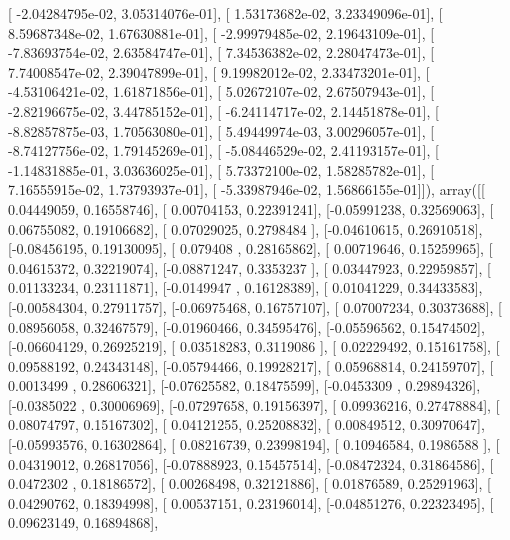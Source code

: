 \documentclass{article}
\begin{document}
       [ -2.04284795e-02,   3.05314076e-01],
       [  1.53173682e-02,   3.23349096e-01],
       [  8.59687348e-02,   1.67630881e-01],
       [ -2.99979485e-02,   2.19643109e-01],
       [ -7.83693754e-02,   2.63584747e-01],
       [  7.34536382e-02,   2.28047473e-01],
       [  7.74008547e-02,   2.39047899e-01],
       [  9.19982012e-02,   2.33473201e-01],
       [ -4.53106421e-02,   1.61871856e-01],
       [  5.02672107e-02,   2.67507943e-01],
       [ -2.82196675e-02,   3.44785152e-01],
       [ -6.24114717e-02,   2.14451878e-01],
       [ -8.82857875e-03,   1.70563080e-01],
       [  5.49449974e-03,   3.00296057e-01],
       [ -8.74127756e-02,   1.79145269e-01],
       [ -5.08446529e-02,   2.41193157e-01],
       [ -1.14831885e-01,   3.03636025e-01],
       [  5.73372100e-02,   1.58285782e-01],
       [  7.16555915e-02,   1.73793937e-01],
       [ -5.33987946e-02,   1.56866155e-01]]), array([[ 0.04449059,  0.16558746],
       [ 0.00704153,  0.22391241],
       [-0.05991238,  0.32569063],
       [ 0.06755082,  0.19106682],
       [ 0.07029025,  0.2798484 ],
       [-0.04610615,  0.26910518],
       [-0.08456195,  0.19130095],
       [ 0.079408  ,  0.28165862],
       [ 0.00719646,  0.15259965],
       [ 0.04615372,  0.32219074],
       [-0.08871247,  0.3353237 ],
       [ 0.03447923,  0.22959857],
       [ 0.01133234,  0.23111871],
       [-0.0149947 ,  0.16128389],
       [ 0.01041229,  0.34433583],
       [-0.00584304,  0.27911757],
       [-0.06975468,  0.16757107],
       [ 0.07007234,  0.30373688],
       [ 0.08956058,  0.32467579],
       [-0.01960466,  0.34595476],
       [-0.05596562,  0.15474502],
       [-0.06604129,  0.26925219],
       [ 0.03518283,  0.3119086 ],
       [ 0.02229492,  0.15161758],
       [ 0.09588192,  0.24343148],
       [-0.05794466,  0.19928217],
       [ 0.05968814,  0.24159707],
       [ 0.0013499 ,  0.28606321],
       [-0.07625582,  0.18475599],
       [-0.0453309 ,  0.29894326],
       [-0.0385022 ,  0.30006969],
       [-0.07297658,  0.19156397],
       [ 0.09936216,  0.27478884],
       [ 0.08074797,  0.15167302],
       [ 0.04121255,  0.25208832],
       [ 0.00849512,  0.30970647],
       [-0.05993576,  0.16302864],
       [ 0.08216739,  0.23998194],
       [ 0.10946584,  0.1986588 ],
       [ 0.04319012,  0.26817056],
       [-0.07888923,  0.15457514],
       [-0.08472324,  0.31864586],
       [ 0.0472302 ,  0.18186572],
       [ 0.00268498,  0.32121886],
       [ 0.01876589,  0.25291963],
       [ 0.04290762,  0.18394998],
       [ 0.00537151,  0.23196014],
       [-0.04851276,  0.22323495],
       [ 0.09623149,  0.16894868],
\end{document}
